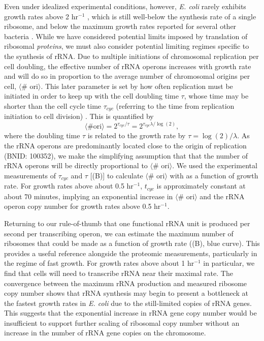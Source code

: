 Even under idealized experimental conditions, however, \textit{E. coli} rarely
exhibits growth rates above 2 hr$^{-1}$ \citep{bremer2008}, which is still
well-below the synthesis rate of a single ribosome, and below the maximum growth
rates reported for several other bacteria \citep{roller2016}. While we have
considered potential limits imposed by translation of ribosomal
\textit{proteins}, we must also consider potential limiting regimes specific to
the synthesis of rRNA. Due to multiple initiations of chromosomal replication
per cell doubling, the effective number of rRNA operons increases with growth
rate and will do so in proportion to the average number of chromosomal origins
per cell, $\langle$\# ori$\rangle$. This later parameter is set by how often
replication must be initiated in order to keep up with the cell doubling time
$\tau$, whose time may be shorter than the cell cycle time $\tau_{cyc}$
(referring to the time from replication initiation to cell division)
\citep{dennis2004, ho2015}. This is quantified by
\begin{equation}
    \langle \text{\# ori} \rangle = 2^{\tau_{cyc} / \tau} = 2^{\tau_{cyc} \lambda / \log(2)},
    \label{eq:Nori}
\end{equation}
where the doubling time $\tau$ is related to the growth rate by $\tau =
\log(2)/\lambda$. As the rRNA operons are predominantly located close to the
origin of replication (BNID: 100352), we make the simplifying assumption that
that the number of rRNA operons will be directly proportional to $\langle$\#
ori$\rangle$.  We used the experimental measurements of $\tau_{cyc}$ and $\tau$  [(B)] to
calculate $\langle$\# ori$\rangle$  with  as a function of growth
rate. For growth rates above about 0.5 hr$^{-1}$, $t_{cyc}$ is approximately
constant at about 70 minutes, implying an exponential increase in $\langle$\#
ori$\rangle$  and the rRNA operon copy number for growth rates above 0.5
hr$^{-1}$.

Returning to our rule-of-thumb that one functional rRNA unit is produced per
second per transcribing operon, we can estimate the maximum number of ribosomes
that could be made as a function of growth rate ((B), blue
curve). This provides a useful reference alongside the proteomic measurements,
particularly in the regime of fast growth. For growth rates above about 1
hr$^{-1}$ in particular, we find that cells will need to transcribe rRNA near
their maximal rate. The convergence between the maximum rRNA production and
measured ribosome copy number shows that rRNA synthesis may begin to present a
bottleneck at the fastest growth rates in \textit{E. coli} due to the
still-limited copies of rRNA genes. This suggests that the exponential increase
in rRNA gene copy number would be insufficient to support further scaling of
ribosomal copy number without an increase in the number of rRNA gene
copies on the chromosome.
